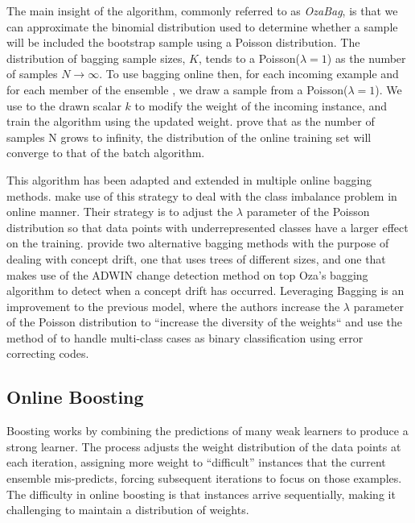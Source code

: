 The main insight of the algorithm, commonly referred to as \emph{OzaBag}, is that we can approximate the binomial distribution
used to determine whether a sample will be included the bootstrap
sample using a Poisson distribution. The distribution of bagging sample sizes, $K$, tends
to a Poisson($\lambda = 1$) as the number of samples $N \rightarrow \infty$. To use bagging online then,
for each incoming example and
for each member of the ensemble \ensemble, we draw a sample from a Poisson($\lambda = 1$). We use to the drawn scalar $k$ to modify the weight of the incoming instance, and train the algorithm using the updated weight. \citet{Oza2001online} prove that as the number of samples N grows
to infinity, the distribution of the online training set will converge to that of the batch algorithm.

This algorithm has been adapted and extended in multiple online bagging methods. \citet{online-bag-imbalance}
make use of this strategy to deal with the class imbalance problem in online manner. Their strategy
is to adjust the $\lambda$ parameter of the Poisson distribution so that data points with underrepresented
classes have a larger effect on the training. \citet{new-ensemble-methods} provide two alternative
bagging methods with the purpose of dealing with concept drift, one that uses trees of different
sizes, and one that makes use of the ADWIN \cite{adwin} change detection method on top Oza's bagging algorithm to detect when a concept drift has occurred. Leveraging Bagging \cite{leveraging-bagging} is an improvement to the previous model,
where the authors increase the $\lambda$ parameter of the Poisson distribution to ``increase the diversity of the weights`` and use the method of \citet{multiclass-codes} to handle multi-class cases
as binary classification using error correcting codes.

\subsection{Online Boosting}

Boosting works by combining the predictions of many weak learners to produce a
strong learner. The process adjusts the weight distribution of the data points
at each iteration, assigning more weight to ``difficult'' instances that the
current ensemble mis-predicts, forcing subsequent iterations to focus on those
examples. The difficulty in online boosting is that
instances arrive sequentially, making it challenging to maintain a distribution
of weights.

